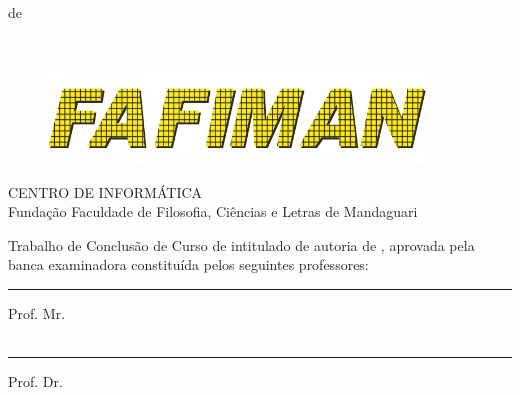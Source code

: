 \documentclass{tcc}
\begin{document}
\vfill
\begin{center}
\MONTH de \the\year
\end{center}

\newpage

$ $
\vfill


\begin{flushright}
\end{flushright}

\newpage

\begin{figure}[H]
\centering
\includegraphics[width=100mm]{imagens/logo3.jpg}
\end{figure}

\begin{center}
CENTRO DE INFORMÁTICA \\
Fundação Faculdade de Filosofia, Ciências e Letras de Mandaguari
\end{center}

\vspace{0.05in}

Trabalho de Conclusão de Curso de \nomedocurso  intitulado \textit{\bf \em \thetitle} de autoria de \theauthor, aprovada pela banca examinadora constituída pelos seguintes professores: \\

\vspace{0.7in}

\hrule
\noindent Prof. Mr. \profb\\
\insta\\

\vspace{0.25in}

\hrule
\noindent Prof. Dr. \profb\\
\instb\\
\end{document}

